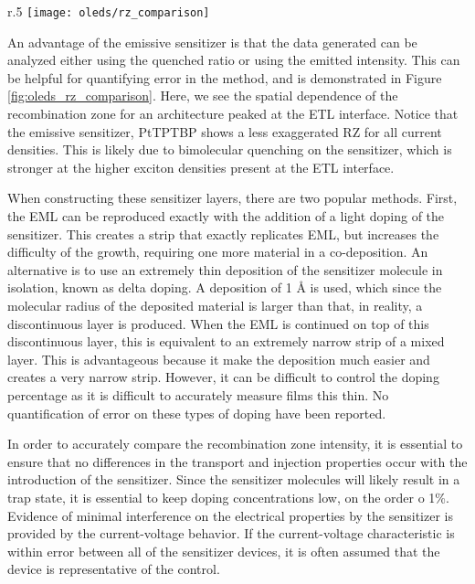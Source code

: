 \documentclass[../thesis.tex]{subfiles}
\begin{document}
\begin{wrapfigure}{r}{.5\textwidth}
\texttt{[image: oleds/rz\_comparison]}
\caption{Recombination zone comparison for an emissive sensitizer analyzed using the quenched ratio and the emitted ratio as a function of current density.}
\label{fig:oleds_rz_comparison}
\end{wrapfigure}

An advantage of the emissive sensitizer is that the data generated can be analyzed either using the quenched ratio or using the emitted intensity.
This can be helpful for quantifying error in the method, and is demonstrated in Figure \ref{fig:oleds_rz_comparison}.
Here, we see the spatial dependence of the recombination zone for an architecture peaked at the ETL interface.
Notice that the emissive sensitizer, PtTPTBP shows a less exaggerated RZ for all current densities.  
This is likely due to bimolecular quenching on the sensitizer, which is stronger at the higher exciton densities present at the ETL interface.

When constructing these sensitizer layers, there are two popular methods.  
First, the EML can be reproduced exactly with the addition of a light doping of the sensitizer.  
This creates a strip that exactly replicates EML, but increases the difficulty of the growth, requiring one more material in a co-deposition.
An alternative is to use an extremely thin deposition of the sensitizer molecule in isolation, known as delta doping.
A deposition of 1 \r{A} is used, which since the molecular radius of the deposited material is larger than that, in reality, a discontinuous layer is produced.
When the EML is continued on top of this discontinuous layer, this is equivalent to an extremely narrow strip of a mixed layer.
This is advantageous because it make the deposition much easier and creates a very narrow strip.
However, it can be difficult to control the doping percentage as it is difficult to accurately measure films this thin.
No quantification of error on these types of doping have been reported.

In order to accurately compare the recombination zone intensity, it is essential to ensure that no differences in the transport and injection properties occur with the introduction of the sensitizer.
Since the sensitizer molecules will likely result in a trap state, it is essential to keep doping concentrations low, on the order o 1\%.
Evidence of minimal interference on the electrical properties by the sensitizer is provided by the current-voltage behavior.
If the current-voltage characteristic is within error between all of the sensitizer devices, it is often assumed that the device is representative of the control.\supercite{Erickson2013a}
\end{document}
